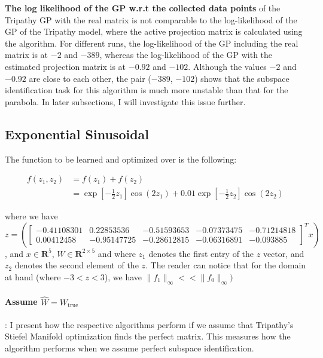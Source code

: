 \textbf{The log likelihood of the GP w.r.t the collected data points} of the Tripathy GP with the real matrix is not comparable to the log-likelihood of the GP of the Tripathy model, where the active projection matrix is calculated using the algorithm.
For different runs, the log-likelihood of the GP including the real matrix is at $-2$ and $-389$, whereas the log-likelihood of the GP with the estimated projection matrix is at $-0.92$ and $-102$. 
Although the values $-2$ and $-0.92$ are close to each other, the pair ($-389$, $-102$) shows that the subspace identification task for this algorithm is much more unstable than that for the parabola.
In later subsections, I will investigate this issue further.

\subsection{Exponential Sinusoidal}

The function to be learned and optimized over is the following:

\def\WSinusoidal5D{
\begin{bmatrix}
		-0.41108301 & 0.22853536 & -0.51593653 & -0.07373475 & -0.71214818 \\
           0.00412458 & -0.95147725 & -0.28612815 & -0.06316891 & -0.093885
\end{bmatrix}}

\begin{align}
f(z_1, z_2) & = f(z_1) + f(z_2) \\
& = \exp{\left[-\frac{1}{2} z_1 \right]}   \cos{(2 z_1)} + 0.01   \exp{\left[-\frac{1}{2} z_2 \right] }   \cos{(2 z_2)}
\end{align}

where we have \\
$z = \left( \WSinusoidal5D^T x \right) $, and $ x \in \mathbf{R}^5$, $W \in \mathbf{R}^{2 \times 5}$
and where $z_1$ denotes the first entry of the $z$ vector, and $z_2$ denotes the second element of the $z$.
The reader can notice that for the domain at hand (where $-3 < z < 3$), we have $ \lVert f_1 \rVert_{\infty} << \lVert f_0 \rVert_{\infty})$

\paragraph{Assume $\hat{W} = W_{\text{true}}$}: I present how the respective algorithms perform if we assume that Tripathy's Stiefel Manifold optimization finds the perfect matrix.
This measures how the algorithm performs when we assume perfect subspace identification.

